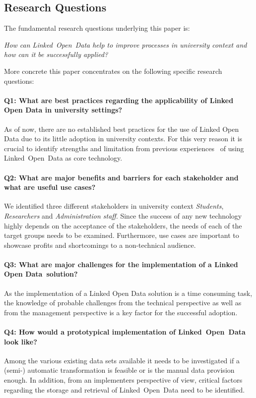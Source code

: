 \documentclass{article}
\begin{document}
\subsection{Research Questions}
\label{introduction:research-questions}
The fundamental research questions underlying this paper is:
\begin{displayquote}
\textit{How can Linked~Open~Data help to improve processes in university context and how can it be successfully applied?}
\end{displayquote}
More concrete this paper concentrates on the following specific research questions:
\paragraph{Q1: What are best practices regarding the applicability of Linked Open Data in university settings?}
As of now, there are no established best practices for the use of Linked Open Data due to its little adoption in university contexts. For this very reason it is crucial to identify strengths and limitation from previous experiences~\cite{daquin_members_2014} of using Linked~Open~Data as core technology. 
\paragraph{Q2: What are major benefits and barriers for each stakeholder and what are useful use cases?}
We identified three different stakeholders in university context \textit{Students}, \textit{Researchers} and \textit{Administration staff}. Since the success of any new technology highly depends on the acceptance of the stakeholders, the needs of each of the target groups needs to be examined. Furthermore, use cases are important to showcase profits and shortcomings to a non-technical audience. 
\paragraph{Q3: What are major challenges for the implementation of a Linked Open Data~solution?}
As the implementation of a Linked Open Data solution is a time consuming task, the knowledge of probable challenges from the technical perspective as well as from the management perspective is a key factor for the successful adoption. 
\paragraph{Q4: How would a prototypical implementation of Linked~Open~Data look like?}
Among the various existing data sets available it needs to be investigated if a (semi-) automatic transformation is feasible or is the manual data provision enough. In addition, from an implementers perspective of view, critical factors regarding the storage and retrieval of Linked~Open~Data need to be identified. 
\end{document}
